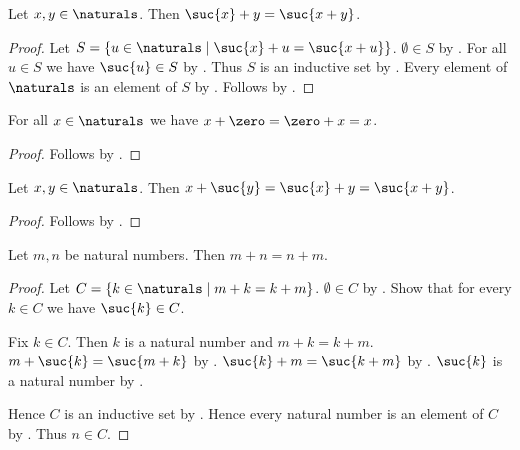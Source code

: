 \begin{proposition}\label{num_addition_successor_left}
    Let $x,y\in\naturals$.
    Then $\suc{x}+y=\suc{x+y}$.
\end{proposition}
\begin{proof}
    Let $S=\{u\in\naturals\mid
        \text{$\suc{x}+u=\suc{x+u}$}\}$.
    $\emptyset\in S$
        by .
    For all $u\in S$ we have $\suc{u}\in S$
        by .
    Thus $S$ is an inductive set by .
    Every element of $\naturals$ is an element of $S$
        by .
    Follows by \auto.
\end{proof}

\begin{proposition}\label{num_addition_axiom_1}
    For all $x\in\naturals$ we have
        $x+\zero=\zero+x=x$.
\end{proposition}
\begin{proof}
    Follows by .
\end{proof}

\begin{proposition}\label{num_addition_axiom_2}
    Let $x,y\in\naturals$.
    Then $x+\suc{y}=\suc{x}+y=\suc{x+y}$.
\end{proposition}
\begin{proof}
    Follows by .
\end{proof}

\begin{theorem}\label{natural_addition_commutative}
    Let $m,n$ be natural numbers.
    Then $m+n=n+m$.
\end{theorem}
\begin{proof}
    Let $C=\{k\in\naturals\mid \text{$m+k=k+m$}\}$.
    $\emptyset\in C$
        by .
    Show that for every $k\in C$ we have $\suc{k}\in C$.
    \begin{subproof}
        Fix $k\in C$.
        Then $k$ is a natural number and $m+k=k+m$.
        $m+\suc{k}=\suc{m+k}$
            by .
        $\suc{k}+m=\suc{k+m}$
            by .
        $\suc{k}$ is a natural number by .
    \end{subproof}
    Hence $C$ is an inductive set by .
    Hence every natural number is an element of $C$
        by .
    Thus $n\in C$.
\end{proof}

